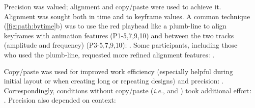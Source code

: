     Precision was valued; alignment and copy/paste were used to achieve it.
%       
%       
    Alignment was sought both in time and to keyframe values.
    A common technique (\autoref{fig:path:bytime}b) was to use the red playhead like a plumb-line to align keyframes with animation features (P1-5,7,9,10) and between the two tracks (amplitude and frequency) (P3-5,7,9,10): .
    Some participants, including those who used the plumb-line, requested
    more refined alignment features: . %

    Copy/paste was used for improved  work efficiency (especially helpful during initial layout or when creating long or repeating designs)
    and precision:
    .
    Correspondingly, conditions without copy/paste (\emph{i.e.}, \lo and \vis) took additional effort:
    .
    Precision also depended on context: %

